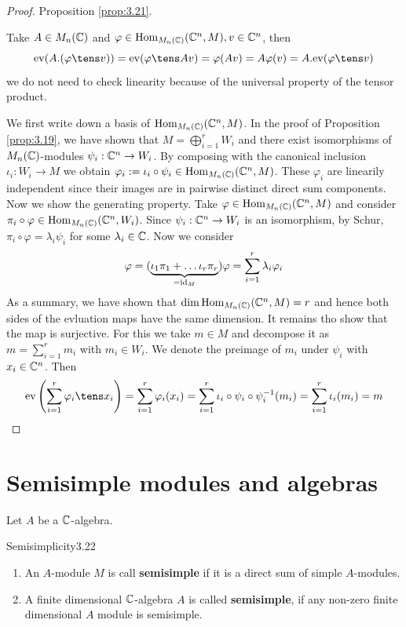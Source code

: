 \documentclass[twoside = false,	%
		headsepline,		%
		parskip = true,
		]{scrbook}						%
\begin{document}
    \begin{proof}
        Proposition \ref{prop:3.21}.

        Take $A \in M_n(\mathbb C)$ and $\varphi \in \mathrm{Hom}_{M_n(\mathbb C)}(\mathbb C^n, M), v \in \mathbb C^n$, then
        \begin{equation*}
            \ev(A.(\varphi \tens v)) = \ev(\varphi \tens Av) = \varphi(Av) = A \varphi(v) = A.\ev(\varphi \tens v)
        \end{equation*}
        we do not need to check linearity because of the universal property of the tensor product.

        We first write down a basis of $\mathrm{Hom}_{M_n(\mathbb C)}(\mathbb C^n,M)$. In the proof of Proposition \ref{prop:3.19}, we have shown that $M = \bigoplus_{i=1}^r W_i$ and there exist isomorphisms of $M_n(\mathbb C)$-modules $\psi_i:\mathbb C^n \to W_i$. By composing with the canonical inclusion $\iota_i: W_i \to M$ we obtain $\varphi_i:= \iota_i \circ \psi_i \in \mathrm{Hom}_{M_n(\mathbb C)}(\mathbb C^n,M)$. These $\varphi_i$ are linearily independent since their images are in pairwise distinct direct sum components.
        Now we show the generating property. Take $\varphi \in \mathrm{Hom}_{M_n(\mathbb C)}(\mathbb C^n,M)$ and consider $\pi_i \circ \varphi \in \mathrm{Hom}_{M_n(\mathbb C)}(\mathbb C^n,W_i)$. Since $\psi_i: \mathbb C^n \to W_i$ is an isomorphism, by Schur, $\pi_i \circ \varphi = \lambda_i \psi_i$ for some $\lambda_i \in \mathbb C$. Now we consider
        \begin{equation*}
            \varphi = (\underbrace{\iota_1\pi_1 + \dots \iota_r \pi_r}_{=\mathrm{id}_M})\varphi = \sum_{i=1}^r \lambda_i \varphi_i
        \end{equation*}
        As a summary, we have shown that $\dim \mathrm{Hom}_{M_n(\mathbb C)}(\mathbb C^n,M) = r$ and hence both sides of the evluation maps have the same dimension. It remains tho show that the map is surjective. For this we take $m \in M$ and decompose it as $m = \sum_{i=1}^r m_i$ with $m_i \in W_i$. We denote the preimage of $m_i$ under $\psi_i$ with $x_i \in \mathbb C^n$. Then
        \begin{equation*}
            \ev \round{\sum_{i=1}^r \varphi_i \tens x_i} = \sum_{i=1}^r \varphi_i(x_i) = \sum_{i=1}^r \iota_i \circ \psi_i \circ \psi_i^{-1}(m_i) = \sum_{i=1}^r \iota_i(m_i) = m
        \end{equation*}
    \end{proof}

\section{Semisimple modules and algebras}
    Let $A$ be a $\mathbb C$-algebra.
    \begin{definition}{Semisimplicity}{3.22}
        \begin{enumerate}
            \item An $A$-module $M$ is call \textbf{semisimple} if it is a direct sum of simple $A$-modules.
            \item A finite dimensional $\mathbb C$-algebra $A$ is called \textbf{semisimple}, if any non-zero finite dimensional $A$ module is semisimple.
        \end{enumerate}
    \end{definition}
\end{document}
